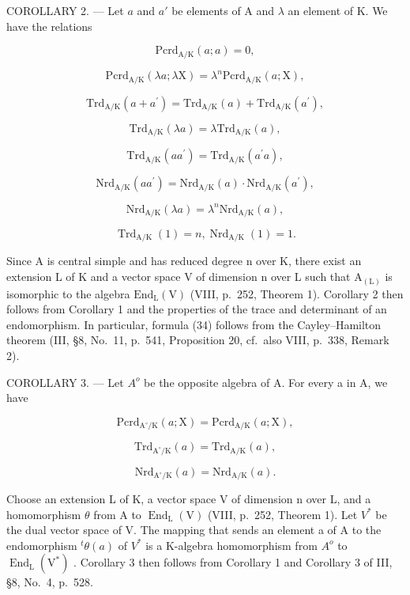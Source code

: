 COROLLARY 2. --- Let \(a\) and \(a'\) be elements of A and \(\lambda\) an element of K. We have the relations

\[
\mathrm{Pcrd} _ {\mathrm{A/K}} (a; a) = 0,\tag{34}
\]

\[
\mathrm{Pcrd} _ {\mathrm{A/K}} (\lambda a; \lambda \mathrm{X}) = \lambda^ {n} \mathrm{Pcrd} _ {\mathrm{A/K}} (a; \mathrm{X}),\tag{35}
\]

\[
\mathrm{Trd} _ {\mathrm{A/K}} (a + a ^ {\prime}) = \mathrm{Trd} _ {\mathrm{A/K}} (a) + \mathrm{Trd} _ {\mathrm{A/K}} (a ^ {\prime}),\tag{36}
\]

\[
\mathrm{Trd} _ {\mathrm{A/K}} (\lambda a) = \lambda \mathrm{Trd} _ {\mathrm{A/K}} (a),
\]

\[
\mathrm{Trd} _ {\mathrm{A/K}} (a a ^ {\prime}) = \mathrm{Trd} _ {\mathrm{A/K}} (a ^ {\prime} a),\tag{37}
\]

\[
\mathrm{Nrd} _ {\mathrm{A/K}} (a a ^ {\prime}) = \mathrm{Nrd} _ {\mathrm{A/K}} (a) \cdot \mathrm{Nrd} _ {\mathrm{A/K}} (a ^ {\prime}),\tag{38}
\]

\[
\mathrm{Nrd} _ {\mathrm{A/K}} (\lambda a) = \lambda^ {n} \mathrm{Nrd} _ {\mathrm{A/K}} (a),
\]

\[
\operatorname{Trd} _ {\mathrm{A} / \mathrm{K}} (1) = n, \operatorname{Nrd} _ {\mathrm{A} / \mathrm{K}} (1) = 1.\tag{39}
\]

Since A is central simple and has reduced degree n over K, there exist an extension L of K and a vector space V of dimension n over L such that \(\mathrm{A}_{(\mathrm{L})}\) is isomorphic to the algebra \(\mathrm{End}_{\mathrm{L}}(\mathrm{V})\) (VIII, p.~252, Theorem 1). Corollary 2 then follows from Corollary 1 and the properties of the trace and determinant of an endomorphism. In particular, formula (34) follows from the Cayley--Hamilton theorem (III, §8, No.~11, p.~541, Proposition 20, cf.~also VIII, p.~338, Remark 2).

COROLLARY 3. --- Let \(A^{o}\) be the opposite algebra of A. For every a in A, we have

\[
\mathrm{Pcrd} _ {\mathrm {A^ {\circ} /K}} (a; \mathrm{X}) = \mathrm{Pcrd} _ {\mathrm{A/K}} (a; \mathrm{X}),\tag{40}
\]

\[
\mathrm{Trd} _ {\mathrm {A^{\circ} /K}} (a) = \mathrm{Trd} _ {\mathrm{A/K}} (a),\tag{41}
\]

\[
\mathrm{Nrd} _ {\mathrm {A^{\circ} /K}} (a) = \mathrm{Nrd} _ {\mathrm{A/K}} (a).\tag{42}
\]

Choose an extension L of K, a vector space V of dimension n over L, and a homomorphism \(\theta\) from A to \(\operatorname{End}_{\mathrm{L}}(\mathrm{V})\) (VIII, p.~252, Theorem 1). Let \(V^{*}\) be the dual vector space of V. The mapping that sends an element a of A to the endomorphism \({}^{t}\theta(a)\) of \(V^{*}\) is a K-algebra homomorphism from \(A^{o}\) to \(\operatorname{End}_{\mathrm{L}}(\mathrm{V}^{*})\) . Corollary 3 then follows from Corollary 1 and Corollary 3 of III, §8, No.~4, p.~528.

